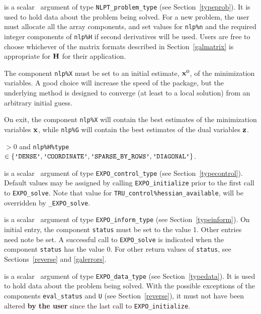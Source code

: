 \documentclass{galahad}
\newcommand{\packagename}{EXPO}
\newcommand{\fullpackagename}{\libraryname\_\packagename}
\newcommand{\solver}{{\tt \fullpackagename\_solve}}
\begin{document}
\vspace*{-2mm}
\begin{description}
 is a scalar \intentinout\ argument of type
{\tt NLPT\_problem\_type}
(see Section~\ref{typeprob}).
It is used to hold data about the problem being solved.
For a new problem, the user must allocate all the array components,
and set values for {\tt nlp\%n}
and the required integer components of {\tt nlp\%H} if second derivatives
will be used.
Users are free to choose whichever
of the matrix formats described in Section~\ref{galmatrix}
is appropriate for ${\mathbf{H}}$ for their application.

\noindent
The component {\tt nlp\%X} must be set to an initial estimate, ${\mathbf{x}}^{0}$,
of the minimization variables. A good choice will increase the speed
of the package, but the underlying method is designed to converge (at least
to a local solution) from an arbitrary initial guess.

\noindent
On exit, the component {\tt nlp\%X} will contain the best estimates of the
minimization variables ${\mathbf{x}}$, while {\tt nlp\%G} will contain the best 
estimates of the dual variables ${\mathbf{z}}$.

\noindent
{} $> 0$ and
{\tt nlp\%H\%type} $\in \{
  \mbox{\tt 'DENSE'}, \mbox{\tt 'COORDINATE'}, \mbox{\tt 'SPARSE\_BY\_ROWS'},
  \mbox{\tt 'DIAGONAL'} \}$.

 is a scalar \intentin\ argument of type
{\tt \packagename\_control\_type}
(see Section~\ref{typecontrol}). Default values may be assigned by calling
{\tt \packagename\_initialize} prior to the first call to
{\tt \packagename\_solve}. 
Note that value for {\tt TRU\_control\%hessian\_available},
will be overridden by \solver.

 is a scalar \intentinout\ argument of type
{\tt \packagename\_inform\_type}
(see Section~\ref{typeinform}).
On initial entry, the  component {\tt status} must be set to the value 1.
Other entries need note be set.
A successful call to
{\tt \packagename\_solve}
is indicated when the  component {\tt status} has the value 0.
For other return values of {\tt status}, see Sections~\ref{reverse} and
\ref{galerrors}.

 is a scalar \intentinout\ argument of type
{\tt \packagename\_data\_type}
(see Section~\ref{typedata}). It is used to hold data about the problem being
solved. With the possible exceptions of the components
{\tt eval\_status} and {\tt U} (see Section~\ref{reverse}),
it must not have been altered {\bf by the user} since the last call to
{\tt \packagename\_initialize}.


\end{description}
\end{document}
